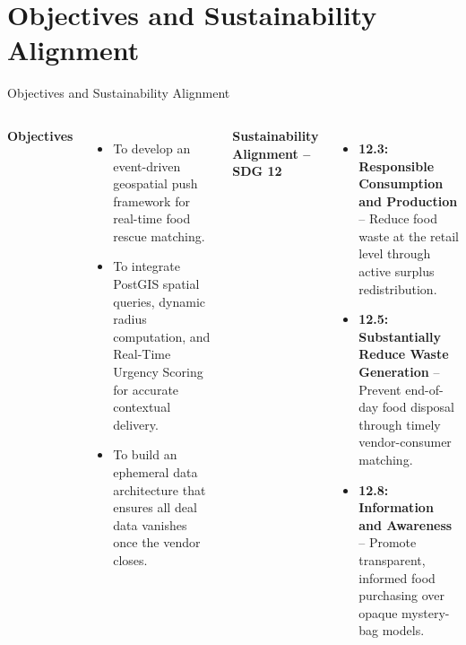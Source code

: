 \documentclass[aspectratio=169,xcolor=dvipsnames]{beamer}
\begin{document}
\section{Objectives and Sustainability Alignment}

\begin{frame}{Objectives and Sustainability Alignment}
\justifying

\begin{columns}[t]


\textbf{Objectives}

\begin{itemize}
    \item To develop an event-driven geospatial push framework for real-time food rescue matching.

    \item To integrate PostGIS spatial queries, dynamic radius computation, and Real-Time Urgency Scoring for accurate contextual delivery.

    \item To build an ephemeral data architecture that ensures all deal data vanishes once the vendor closes.
\end{itemize}


\textbf{Sustainability Alignment -- SDG 12}

\begin{itemize}
    \item \textbf{12.3: Responsible Consumption and Production} -- Reduce food waste at the retail level through active surplus redistribution.

    \item \textbf{12.5: Substantially Reduce Waste Generation} -- Prevent end-of-day food disposal through timely vendor-consumer matching.

    \item \textbf{12.8: Information and Awareness} -- Promote transparent, informed food purchasing over opaque mystery-bag models.
\end{itemize}

\end{columns}

\end{frame}
\end{document}

